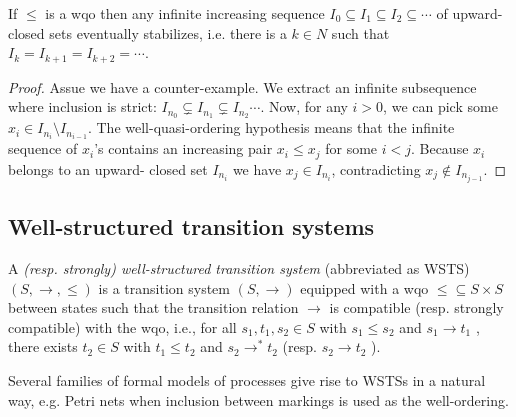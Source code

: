 \begin{lemma}  \label{upward-closed stablizes}
If $\leq$ is a wqo then any infinite increasing sequence $I_0 \subseteq I_1 \subseteq I_2 \subseteq \cdots$ of
upward-closed sets eventually stabilizes, i.e. there is a $k \in N$ such that 
$I_k = I_{k+1} = I_{k+2} = \cdots $.
\end{lemma}

\begin{proof}
Assue we have a counter-example.
We extract an infinite subsequence where
inclusion is strict: $I_{n_0} \subsetneq I_{n_1} \subsetneq I_{n_2} \cdots$. Now, for any $i>0$, we can pick some $x_i \in I_{n_i} \setminus I_{n_{i-1}}$. The well-quasi-ordering hypothesis means that the infinite sequence of $x_i$'s
contains an increasing pair $x_i \leq x_j$ for some $i<j$. Because $x_i$ belongs to an upward-
closed set $I_{n_i}$ we have $x_j \in I_{n_i} $, contradicting $x_j \not\in I_{n_{ j - 1}}$.
\end{proof}




\subsection{Well-structured transition systems}


\begin{definition}\cite{DBLP:journals/tcs/FinkelS01}
A {\em (resp. strongly) well-structured transition system} (abbreviated as WSTS)  $(S, \rightarrow, \leq)$
is a transition system $(S, \rightarrow)$
equipped with a wqo ${\leq} \subseteq S \times S$ between states such that  
the transition relation $ \rightarrow$ is compatible (resp. strongly compatible) with the wqo, i.e., for all 
$s_1, t_1 , s_2 \in S$
	with $s_1 \leq s_2$  and $s_1 \rightarrow t_1$ , there exists 
	$t_2 \in S$ with 
	$t_1 \leq t_2$ and $s_2 \rightarrow^{*} t_2$ 			
				(resp. $s_2 \rightarrow t_2$ ).
\end{definition}

Several families of formal models of processes give rise to WSTSs in a natural way, e.g. Petri nets when inclusion between markings is used as the well-ordering.



